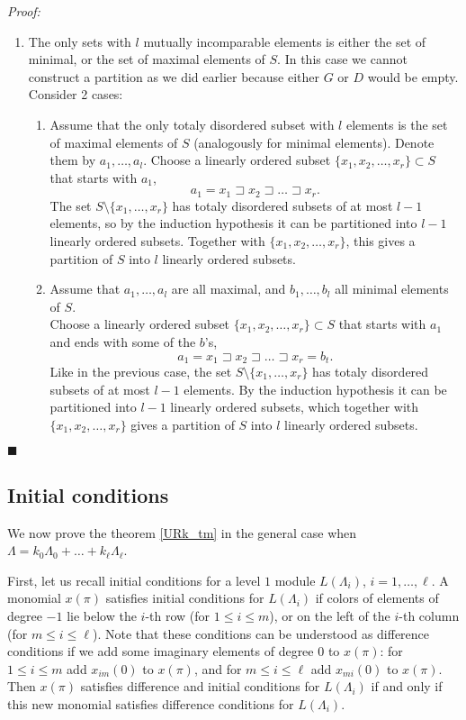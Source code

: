 \documentclass[a4paper, 10pt,oneside]{amsart}
\newenvironment{dokaz}
{\noindent\emph{Proof:}\ }
{\hfill $\blacksquare$}
\begin{document}
\begin{dokaz}
\begin{enumerate}
\item The only sets with $l$ mutually incomparable elements is either the set of minimal, or the set of maximal elements of $S$. In this case we cannot
construct a partition as we did earlier because either $G$ or $D$ would be
empty. Consider 2 cases:
\begin{enumerate}
\item Assume that the only totaly disordered subset with $l$ elements
is the set of maximal elements of $S$ (analogously for minimal
elements). Denote them by $a_1,\dots,a_l$. Choose a linearly
ordered subset $\{x_1, x_2, \dots,x_r\}\subset S$ that starts with
$a_1$,
$$a_1=x_1\sqsupset x_2\sqsupset \dots\sqsupset x_r.$$  The set $S\setminus\{x_1,\dots,x_r\}$ has totaly disordered subsets of
at most $l-1$ elements, so by the induction hypothesis it can be
partitioned into $l-1$ linearly ordered subsets.
Together with $ \{x_1,x_2,\dots,x_r\}$, this gives a partition of $S$ into
$l$ linearly ordered subsets.
\item Assume that $a_1,\dots,a_l$ are all maximal, and
$b_1,\dots,b_l$ all minimal elements of $S$.\\
 Choose a linearly ordered subset $\{x_1, x_2, \dots,x_r\}\subset S$
that starts with $a_1$ and ends with some of the $b$'s, $$a_1=x_1\sqsupset x_2\sqsupset \dots\sqsupset
x_r=b_t.$$ Like in the previous case, the set
$S\setminus\{x_1,\dots,x_r\}$ has totaly disordered subsets of
at most $l-1$ elements. By the induction hypothesis it can be
partitioned into $l-1$ linearly ordered subsets, which
together with $\{x_1,x_2,\dots,x_r\}$  gives a partition of $S$ into
$l$ linearly ordered subsets.
\end{enumerate}
\end{enumerate}
\end{dokaz}

\subsection{Initial conditions}

\label{PUtrik_pogl}

We now prove the theorem \ref{URk_tm} in the general case when
$\Lambda=k_0 \Lambda_0+\dots+k_\ell \Lambda_\ell$.

First, let us recall initial conditions for a level $1$ module
$L(\Lambda_i)$, $i=1,\dots,\ell$. A monomial $x(\pi)$ satisfies initial conditions
for $L(\Lambda_i)$ if colors of elements of degree $-1$
lie below the  $i$-th row  (for
$1\leq i\leq m$), or on the left of the $i$-th column (for $m\leq i\leq \ell$).
Note that these conditions can be understood as difference conditions if
we add some imaginary elements of degree $0$ to $x(\pi)$:
for $1\leq i\leq m$ add $x_{im}(0)$ to $x(\pi)$, and for $m\leq i\leq \ell$
 add $x_{mi}(0)$ to $x(\pi)$. Then $x(\pi)$ satisfies difference and initial conditions for $L(\Lambda_i)$ if and only if this new monomial
 satisfies difference conditions for $L(\Lambda_i)$.
\end{document}
